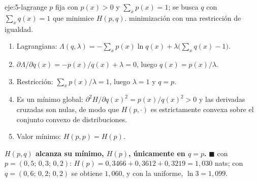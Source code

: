 \begin{solucion}{eje:5-lagrange}
\datos $p$ fija con $p(x)>0$ y $\sum_x p(x)=1$; se busca $q$ con $\sum_x q(x)=1$ que minimice $H(p,q)$.
\planteamiento minimización con una restricción de igualdad.
\pasos
\begin{enumerate}[label=\arabic*.]
  \item Lagrangiana: $\Lambda(q,\lambda)=-\sum_x p(x)\ln q(x)+\lambda\bigl(\sum_x q(x)-1\bigr)$.
  \item $\partial\Lambda/\partial q(x)=-p(x)/q(x)+\lambda=0$, luego $q(x)=p(x)/\lambda$.
  \item Restricción: $\sum_x p(x)/\lambda=1$, luego $\lambda=1$ y $q=p$.
  \item Es un mínimo global: $\partial^{2}H/\partial q(x)^{2}=p(x)/q(x)^{2}>0$ y las derivadas cruzadas son nulas, de modo que $H(p,\cdot)$ es estrictamente convexa sobre el conjunto convexo de distribuciones.
  \item Valor mínimo: $H(p,p)=H(p)$.
\end{enumerate}
\resultado \textbf{$H(p,q)$ alcanza su mínimo, $H(p)$, únicamente en $q=p$.} $\blacksquare$
\comprobacion con $p=(0{,}5;\,0{,}3;\,0{,}2)$: $H(p)=0{,}3466+0{,}3612+0{,}3219=1{,}030$ nats; con $q=(0{,}6;\,0{,}2;\,0{,}2)$ se obtiene $1{,}060$, y con la uniforme, $\ln 3=1{,}099$.
\end{solucion}
